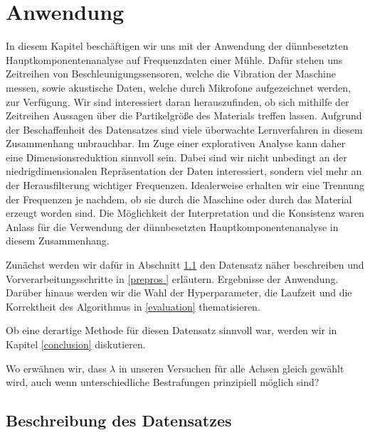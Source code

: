 \chapter{Anwendung}

\label{application}

In diesem Kapitel beschäftigen wir uns mit der Anwendung der dünnbesetzten Hauptkomponentenanalyse auf Frequenzdaten einer Mühle. Dafür stehen uns Zeitreihen von Beschleunigungssensoren, welche die Vibration der Maschine messen, sowie akustische Daten, welche durch Mikrofone aufgezeichnet werden, zur Verfügung. Wir sind interessiert daran herauszufinden, ob sich mithilfe der Zeitreihen Aussagen über die Partikelgröße des Materials treffen lassen. Aufgrund der Beschaffenheit des Datensatzes sind viele überwachte Lernverfahren in diesem Zusammenhang unbrauchbar. Im Zuge einer explorativen Analyse kann daher eine Dimensionsreduktion sinnvoll sein. Dabei sind wir nicht unbedingt an der niedrigdimensionalen Repräsentation der Daten interessiert, sondern viel mehr an der Herausfilterung wichtiger Frequenzen. Idealerweise erhalten wir eine Trennung der Frequenzen je nachdem, ob sie durch die Maschine oder durch das Material erzeugt worden sind. Die Möglichkeit der Interpretation und die Konsistenz waren Anlass für die Verwendung der dünnbesetzten Hauptkomponentenanalyse in diesem Zusammenhang. 

Zunächst werden wir dafür in Abschnitt \ref{data_set} den Datensatz näher beschreiben und Vorverarbeitungsschritte in \ref{prepros
} erläutern. Ergebnisse der Anwendung. Darüber hinaus werden wir die Wahl der Hyperparameter, die Laufzeit und die Korrektheit des Algorithmus in \ref{evaluation} thematisieren.

Ob eine derartige Methode für diesen Datensatz sinnvoll war, werden wir in Kapitel \ref{conclusion} diskutieren.

Wo erwähnen wir, dass $\lambda$ in unseren Versuchen für alle Achsen gleich gewählt wird, auch wenn unterschiedliche Bestrafungen prinzipiell möglich sind?




\section{Beschreibung des Datensatzes}
\label{data_set}

